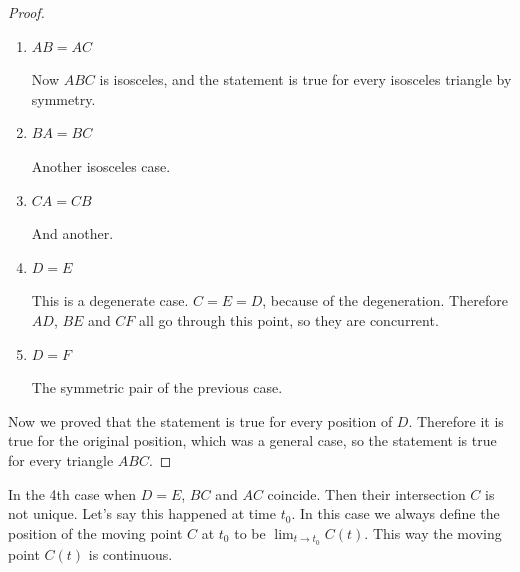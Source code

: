 \documentclass[a4paper]{article}
\begin{document}
\begin{proof}
    \begin{enumerate}
        \item $AB=AC$
        
        Now $ABC$ is isosceles, and the statement is true for every isosceles triangle by symmetry.

        \item $BA=BC$

        Another isosceles case.
        \item $CA=CB$
        
        And another.
        \item $D=E$

        This is a degenerate case. $C=E=D$, because of the degeneration. Therefore $AD$, $BE$ and $CF$ all go through this point, so they are concurrent.

        \item $D=F$

        The symmetric pair of the previous case.
    \end{enumerate}
    Now we proved that the statement is true for every position of $D$. Therefore it is true for the original position, which was a general case, so the statement is true for every triangle $ABC$.
\end{proof}

\begin{remark}
    In the 4th case when $D=E$, $BC$ and $AC$ coincide. Then their intersection $C$ is not unique. Let's say this happened at time $t_0$. In this case we always define the position of the moving point $C$ at $t_0$ to be $\lim_{t\to t_0}C(t)$. This way the moving point $C(t)$ is continuous.
\end{remark}
\end{document}
